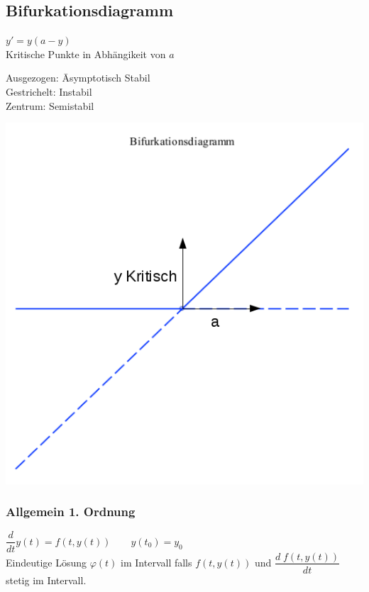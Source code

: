 \subsection{Bifurkationsdiagramm}
\begin{minipage}[h]{0.35\textwidth}
$y'=y(a-y)$\\
Kritische Punkte in Abhängikeit von $a$\\
\begin{tabbing}
Ausgezogen: \= Asymptotisch Stabil\\
Gestrichelt: \> Instabil\\
Zentrum: \> Semistabil\\
\end{tabbing}
\end{minipage}
\begin{minipage}[h]{0.35\textwidth}
	\includegraphics[width=1.0\textwidth]{images/Bifurkationsdiagramm.png}
\end{minipage}

\subsubsection{Allgemein 1. Ordnung}
$\dfrac{d}{dt}y(t)=f(t,y(t)) \qquad y(t_0)=y_0$\\
Eindeutige Lösung $\varphi(t)$ im Intervall falls $f(t,y(t))$ und $\dfrac{d \; f(t,y(t))}{dt}$ stetig im Intervall.
